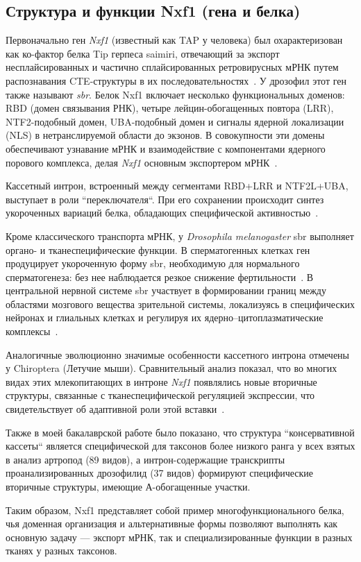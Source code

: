 \subsection{Структура и функции Nxf1 (гена и белка)}

Первоначально ген \textit{Nxf1} (известный как TAP у человека) был охарактеризован как ко-фактор белка Tip герпеса saimiri, отвечающий за экспорт несплайсированных и частично сплайсированных ретровирусных мРНК путем распознавания CTE-структуры в их последовательностях~\cite{Zolotukhin2001}.
У дрозофил этот ген также называют \textit{sbr}.
Белок Nxf1 включает несколько функциональных доменов: RBD (домен связывания РНК), четыре лейцин-обогащенных повтора (LRR), NTF2-подобный домен, UBA-подобный домен и сигналы ядерной локализации (NLS) в нетранслируемой области до экзонов.
В совокупности эти домены обеспечивают узнавание мРНК и взаимодействие с компонентами ядерного порового комплекса, делая \textit{Nxf1} основным экспортером мРНК~\cite{Herold2000,Mamon2013}.

Кассетный интрон, встроенный между сегментами RBD+LRR и NTF2L+UBA, выступает в роли ``переключателя``.
При его сохранении происходит синтез укороченных вариаций белка, обладающих специфической активностью~\cite{Mamon2013,Herold2000}.

Кроме классического транспорта мРНК, у \textit{Drosophila melanogaster} sbr выполняет органо- и тканеспецифические функции.
В сперматогенных клетках ген продуцирует укороченную форму sbr, необходимую для нормального сперматогенеза: без нее наблюдается резкое снижение фертильности~\cite{Ginanova2016}.
В центральной нервной системе sbr участвует в формировании границ между областями мозгового вещества зрительной системы, локализуясь в специфических нейронах и глиальных клетках и регулируя их ядерно–цитоплазматические комплексы~\cite{Mamon2021}.

Аналогичные эволюционно значимые особенности кассетного интрона отмечены у Chiroptera (Летучие мыши).
Сравнительный анализ показал, что во многих видах этих млекопитающих в интроне \textit{Nxf1} появлялись новые вторичные структуры, связанные с тканеспецифической регуляцией экспрессии, что свидетельствует об адаптивной роли этой вставки~\cite{Bondaruk2022}.

Также в моей бакалаврской работе было показано, что структура ``консервативной кассеты`` является специфической для таксонов более низкого ранга у всех взятых в анализ артропод (89 видов), а интрон-содержащие транскрипты проанализированных дрозофилид (37 видов) формируют специфические вторичные структуры, имеющие А-обогащенные участки.

Таким образом, Nxf1 представляет собой пример многофункционального белка, чья доменная организация и альтернативные формы позволяют выполнять как основную задачу — экспорт мРНК, так и специализированные функции в разных тканях у разных таксонов.
